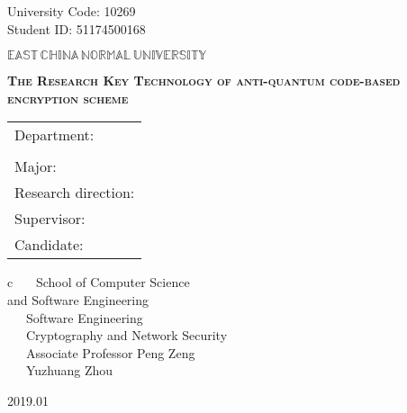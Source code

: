\newpage

\pagestyle{empty}

\hskip 1.83cm {\large University Code: 10269}\\
\hspace*{\fill} {\large Student ID: 51174500168}

\vskip 2cm

\begin{center}
{\Huge $\mathbb{EAST}\,\mathbb{CHINA}\,\mathbb{NORMAL}\,
\mathbb{UNIVERSITY}$}
\end{center}

\vskip 3cm

\begin{center}
\bfseries{\scshape{\huge The Research Key Technology of anti-quantum code-based encryption scheme}}\\
\end{center}

\vskip 2cm {\large
\begin{center}
\begin{tabular}{l}
Department:\\ \\
Major:\\
Research direction:\\
Supervisor:\\
Candidate:
\end{tabular}
\begin{tabular}c
~~~School of Computer Science \\ and Software Engineering       \\
\hline ~~~Software Engineering    \\
\hline ~~~Cryptography and Network Security\\
\hline ~~~Associate Professor Peng Zeng\\
\hline ~~~Yuzhuang Zhou\\
\hline
\end{tabular}
\end{center}}

\vskip 30mm

\begin{center}
{\Large 2019.01}
\end{center}